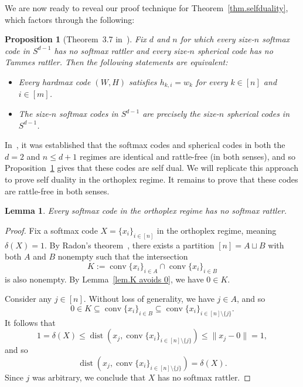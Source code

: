 \documentclass{article}
\theoremstyle{plain}
\newtheorem{lemma}[theorem]{Lemma}
\newtheorem{proposition}[theorem]{Proposition}
\theoremstyle{definition}
\begin{document}
We are now ready to reveal our proof technique for Theorem~\ref{thm.selfduality}, which factors through the following:

\begin{proposition}[Theorem~3.7 in~\cite{JiangEtal:24}]
\label{prop.selfduality from lack of rattlers}
Fix $d$ and $n$ for which every size-$n$ softmax code in $S^{d-1}$ has no softmax rattler and every size-$n$ spherical code has no Tammes rattler.
Then the following statements are equivalent:
\begin{itemize}
\item[(a)] 
Every hardmax code $(W,H)$ satisfies $h_{k,i}=w_k$ for every $k\in[n]$ and $i\in[m]$.
\item[(b)] 
The size-$n$ softmax codes in $S^{d-1}$ are precisely the size-$n$ spherical codes in $S^{d-1}$.
\end{itemize}
\end{proposition}

In~\cite{JiangEtal:24}, it was established that the softmax codes and spherical codes in both the $d=2$ and $n\leq d+1$ regimes are identical and rattle-free (in both senses), and so Proposition~\ref{prop.selfduality from lack of rattlers} gives that these codes are self dual.
We will replicate this approach to prove self duality in the orthoplex regime.
It remains to prove that these codes are rattle-free in both senses.

\begin{lemma}\label{softmax-norattler}
Every softmax code in the orthoplex regime has no softmax rattler.  
\end{lemma}

\begin{proof}
Fix a softmax code $X=\{x_i\}_{i\in[n]}$ in the orthoplex regime, meaning $\delta(X)=1$.
By Radon's theorem~\cite{Radon:21}, there exists a partition $[n]=A\sqcup B$ with both $A$ and $B$ nonempty such that the intersection
\[
K
:=\operatorname{conv}\{x_i\}_{i\in A} \cap \operatorname{conv}\{x_i\}_{i\in B}
\]
is also nonempty. 
By Lemma~\ref{lem.K avoids 0}, we have $0 \in K$. 

Consider any $j\in[n]$.
Without loss of generality, we have $j \in A$, and so 
\[
0
\in K
\subseteq \operatorname{conv}\{x_i\}_{i\in B}
\subseteq \operatorname{conv}\{x_i\}_{i\in[n]\setminus\{j\}}.
\]
It follows that
\[
1
=\delta(X)
\leq\operatorname{dist}(x_j,\operatorname{conv}\{x_i\}_{i\in[n]\setminus\{j\}} )
\leq \|x_j-0\|
=1,
\]
and so
\[
\operatorname{dist}(x_j,\operatorname{conv}\{x_i\}_{i\in[n]\setminus\{j\}} )
=\delta(X).
\]
Since $j$ was arbitrary, we conclude that $X$ has no softmax rattler.
\end{proof}
\end{document}
